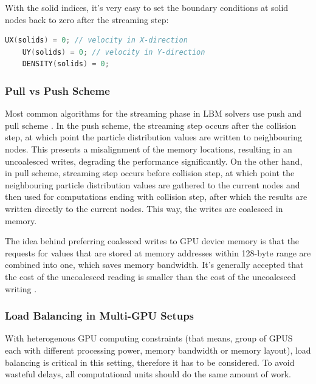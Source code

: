 With the solid indices, it's very easy to set the boundary conditions at solid nodes back to zero after the streaming step:

\begin{lstlisting}[language=Cpp, caption=Boundary conditions at solid nodes.]
	UX(solids) = 0; // velocity in X-direction
	UY(solids) = 0; // velocity in Y-direction
	DENSITY(solids) = 0;
\end{lstlisting}

\subsubsection{Pull vs Push Scheme}

Most common algorithms for the streaming phase in LBM solvers use push and pull scheme \cite{tranPerformanceOptimization3D2017, herschlagGPUDataAccess2018}. In the push scheme, the streaming step occurs after the collision step, at which point the particle distribution values are written to neighbouring nodes. This presents a misalignment of the memory locations, resulting in an uncoalesced writes, degrading the performance significantly. On the other hand, in pull scheme, streaming step occurs before collision step, at which point the neighbouring particle distribution values are gathered to the current nodes and then used for computations ending with collision step, after which the results are written directly to the current nodes. This way, the writes are coalesced in memory.

The idea behind preferring coalesced writes to GPU device memory is that the requests for values that are stored at memory addresses within 128-byte range are combined into one, which saves memory bandwidth. It's generally accepted that the cost of the uncoalesced reading is smaller than the cost of the uncoalesced writing \cite{tranPerformanceOptimization3D2017}.

\subsubsection{Load Balancing in Multi-GPU Setups}
\label{sec:load-balancing}

With heterogenous GPU computing constraints (that means, group of GPUS each with different processing power, memory bandwidth or memory layout), load balancing is critical in this setting, therefore it has to be considered. To avoid wasteful delays, all computational units should do the same amount of work. 

